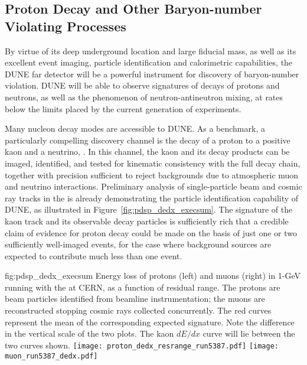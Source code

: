 \subsection{Proton Decay and Other 
Baryon-number Violating Processes}

By virtue of its deep underground location and large fiducial 
mass, as well as its excellent event imaging, particle 
identification and 
calorimetric capabilities, the DUNE far detector will be 
a powerful instrument for discovery of baryon-number violation.
DUNE will be able to observe signatures of decays of protons and 
neutrons, as well as the phenomenon of neutron-antineutron mixing, 
at rates below the limits placed by the current generation of 
experiments.

Many nucleon decay modes are accessible to DUNE.  
As a benchmark, a particularly compelling discovery channel 
is the decay of a proton to a positive kaon and a neutrino, 
\ptoknubar.  In this channel, the kaon and its decay products 
can be imaged, identified, and tested for kinematic consistency 
with the full decay chain, together with precision sufficient to 
reject backgrounds due to atmospheric muon and neutrino 
interactions. 
Preliminary analysis of single-particle beam and cosmic ray tracks 
in the  \lartpc is already demonstrating the particle 
identification capability of DUNE, as illustrated in 
Figure~\ref{fig:pdsp_dedx_execsum}.  
The signature of the kaon track and its observable decay particles is 
sufficiently rich that a credible claim of evidence for 
proton decay could be made on the basis of just 
one or two sufficiently well-imaged events, for the case 
where background sources are expected to contribute much less 
than one event.

\begin{dunefigure}{fig:pdsp_dedx_execsum}
{Energy loss of protons (left) and muons (right) in 1-GeV  
running with the  \lartpc at CERN, as a function of 
residual range.  The protons are beam particles identified from 
beamline instrumentation; the muons are reconstructed stopping 
cosmic rays collected concurrently.  
The red curves represent the mean of the 
corresponding expected signature.  Note the difference in 
the vertical scale of the two plots.  The kaon $dE/dx$ curve 
will lie between the two curves shown.}
\texttt{[image: proton\_dedx\_resrange\_run5387.pdf]}\hspace{0.05\linewidth}
\texttt{[image: muon\_run5387\_dedx.pdf]}
\end{dunefigure}

